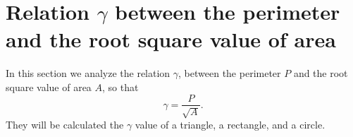 \section{Relation $\gamma$ between the perimeter and the root square value of area}

In this section we analyze the relation $\gamma$, between the perimeter $P$ 
and the root square value of area $A$, so that
\begin{equation}
\gamma=\frac{P}{\sqrt{A}}.
\end{equation}
They will be calculated the $\gamma$ value of a triangle, a rectangle, and a circle. 

